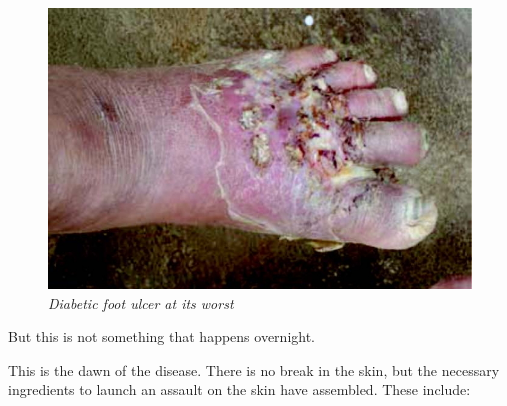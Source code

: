 {\begin{figure}
\includegraphics{images/059.jpg}
\caption{\textit{Diabetic foot ulcer at its worst}}
\end{figure}

But this is not something that happens overnight. 


This is the dawn of the disease. There is no break in the skin, but the necessary ingredients to launch an assault on the skin have assembled. These include:

}
